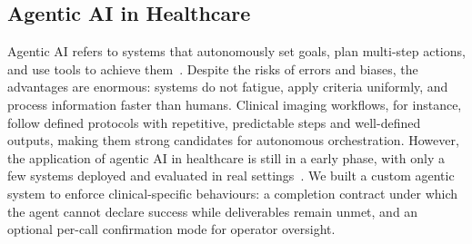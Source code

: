 \documentclass[1p,12pt]{elsarticle}
\begin{document}
\subsection{Agentic AI in Healthcare}
Agentic AI refers to systems that autonomously set goals, plan multi-step actions, and use tools to achieve them~\cite{collaco2026scoping}. %
Despite the risks of errors and biases, the advantages are enormous: systems do not fatigue, apply criteria uniformly, and process information faster than humans. Clinical imaging workflows, for instance, follow defined protocols with repetitive, predictable steps and well-defined outputs, making them strong candidates for autonomous orchestration.
However, the application of agentic AI in healthcare is still in a early phase, with only a few systems deployed and evaluated in real settings~\cite{collaco2026scoping, dietrich2025agentic}. 
We built a custom agentic system to enforce clinical-specific behaviours: a completion contract under which the agent cannot declare success while deliverables remain unmet, and an optional per-call confirmation mode for operator oversight.

\end{document}
